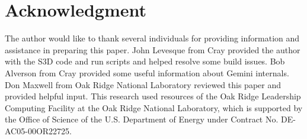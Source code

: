 \documentclass[10pt, conference, compsocconf]{IEEEtran}
\begin{document}
\section*{Acknowledgment} The author would like to thank several individuals
for providing information and assistance in preparing this paper.  John
Levesque from Cray provided the author with the S3D code and run scripts and
helped resolve some build issues. Bob Alverson from Cray provided some useful
information about Gemini internals.  Don Maxwell from Oak Ridge National
Laboratory reviewed this paper and provided helpful input.  This research used
resources of the Oak Ridge Leadership Computing Facility at the Oak Ridge
National Laboratory, which is supported by the Office of Science of the U.S.
Department of Energy under Contract No. DE-AC05-00OR22725. 



%
%




\end{document}
